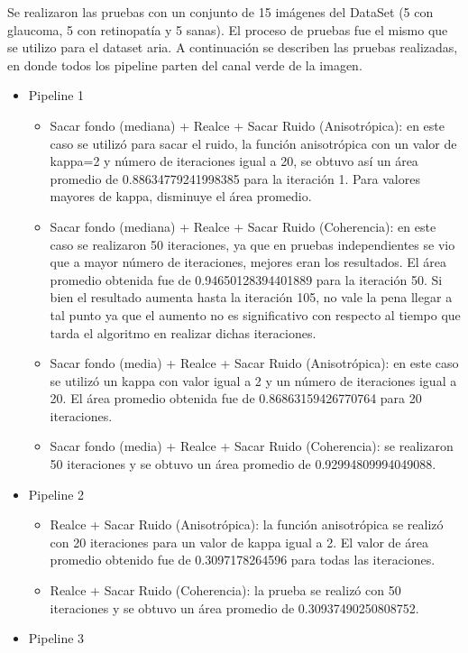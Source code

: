 Se realizaron las pruebas con un conjunto de 15 imágenes del DataSet (5 con glaucoma, 5 con retinopatía y 5 sanas).
El proceso de pruebas fue el mismo que se utilizo para el dataset aria.  A continuación se describen las pruebas realizadas, en donde todos los pipeline parten del canal verde de la imagen.
\begin{itemize}
	\item Pipeline 1
		\begin{itemize}
			\item	Sacar fondo (mediana) + Realce + Sacar Ruido (Anisotrópica): en este caso se utilizó para 	sacar el ruido, la función anisotrópica con un valor de kappa=2 y número de iteraciones igual a 20, se obtuvo así un área promedio de 0.88634779241998385 para la iteración 1. Para valores mayores de kappa, disminuye el área promedio.
			\item	Sacar fondo (mediana) + Realce + Sacar Ruido (Coherencia): en este caso se realizaron 50 iteraciones, ya que en pruebas independientes se vio que a mayor número de iteraciones, mejores eran los resultados. El área promedio obtenida fue de 0.94650128394401889 para la iteración 50. Si bien el resultado aumenta hasta la iteración 105, no vale la pena llegar a tal punto ya que el aumento no es significativo con respecto al tiempo que tarda el algoritmo en realizar dichas iteraciones.
			\item Sacar fondo (media) + Realce + Sacar Ruido (Anisotrópica): en este caso se utilizó un kappa con valor igual a 2 y un número de iteraciones igual a 20. El área promedio obtenida fue de 	 	0.86863159426770764 para 20 iteraciones.
			\item Sacar fondo (media) + Realce + Sacar Ruido (Coherencia): se realizaron 50 iteraciones y se obtuvo un área promedio de 0.92994809994049088.
	\end{itemize}
	\item Pipeline 2
		\begin{itemize}
			\item Realce + Sacar Ruido (Anisotrópica): la función anisotrópica se realizó con 20 iteraciones para un valor de kappa igual a 2. El valor de área promedio obtenido fue de 0.3097178264596 para todas las iteraciones.
			\item	Realce + Sacar Ruido (Coherencia): la prueba se realizó con 50 iteraciones y se obtuvo un área promedio de  0.30937490250808752.
		\end{itemize}
	\item Pipeline 3
		\begin{itemize}

\end{itemize}
\end{itemize}
